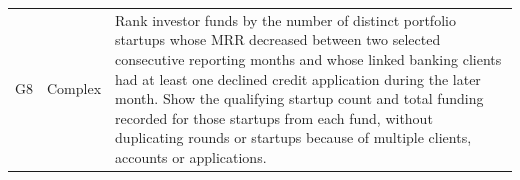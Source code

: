 \documentclass[11pt,a4paper]{article}
\begin{document}
\begin{longtable}{@{}p{0.8cm} p{2.2cm} p{\dimexpr\textwidth-3cm-4\tabcolsep\relax}@{}}
G8 & Complex &
Rank investor funds by the number of distinct portfolio startups whose MRR
decreased between two selected consecutive reporting months and whose
linked banking clients had at least one declined credit application during
the later month. Show the qualifying startup count and total funding recorded
for those startups from each fund, without duplicating rounds or startups
because of multiple clients, accounts or applications.\\

\end{longtable}
\endgroup
\end{document}
